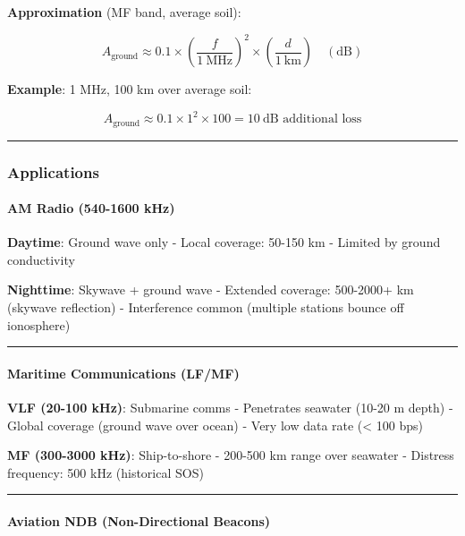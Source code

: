 \textbf{Approximation} (MF band, average soil):

\[
A_{\text{ground}} \approx 0.1 \times \left(\frac{f}{1\ \text{MHz}}\right)^2 \times \left(\frac{d}{1\ \text{km}}\right) \quad (\text{dB})
\]

\textbf{Example}: 1 MHz, 100 km over average soil:

\[
A_{\text{ground}} \approx 0.1 \times 1^2 \times 100 = 10\ \text{dB additional loss}
\]

\begin{center}\rule{0.5\linewidth}{0.5pt}\end{center}

\subsubsection{Applications}\label{applications}

\paragraph{AM Radio (540-1600 kHz)}\label{am-radio-540-1600-khz}

\textbf{Daytime}: Ground wave only - Local coverage: 50-150 km - Limited
by ground conductivity

\textbf{Nighttime}: Skywave + ground wave - Extended coverage: 500-2000+
km (skywave reflection) - Interference common (multiple stations bounce
off ionosphere)

\begin{center}\rule{0.5\linewidth}{0.5pt}\end{center}

\paragraph{Maritime Communications
(LF/MF)}\label{maritime-communications-lfmf}

\textbf{VLF (20-100 kHz)}: Submarine comms - Penetrates seawater (10-20
m depth) - Global coverage (ground wave over ocean) - Very low data rate
(\textless{} 100 bps)

\textbf{MF (300-3000 kHz)}: Ship-to-shore - 200-500 km range over
seawater - Distress frequency: 500 kHz (historical SOS)

\begin{center}\rule{0.5\linewidth}{0.5pt}\end{center}

\paragraph{Aviation NDB (Non-Directional
Beacons)}\label{aviation-ndb-non-directional-beacons}


